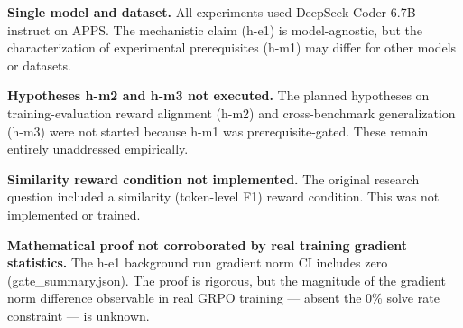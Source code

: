 \textbf{Single model and dataset.} All experiments used DeepSeek-Coder-6.7B-instruct on APPS. The mechanistic claim (h-e1) is model-agnostic, but the characterization of experimental prerequisites (h-m1) may differ for other models or datasets.

\textbf{Hypotheses h-m2 and h-m3 not executed.} The planned hypotheses on training-evaluation reward alignment (h-m2) and cross-benchmark generalization (h-m3) were not started because h-m1 was prerequisite-gated. These remain entirely unaddressed empirically.

\textbf{Similarity reward condition not implemented.} The original research question included a similarity (token-level F1) reward condition. This was not implemented or trained.

\textbf{Mathematical proof not corroborated by real training gradient statistics.} The h-e1 background run gradient norm CI includes zero (gate\_summary.json). The proof is rigorous, but the magnitude of the gradient norm difference observable in real GRPO training --- absent the 0\% solve rate constraint --- is unknown.

